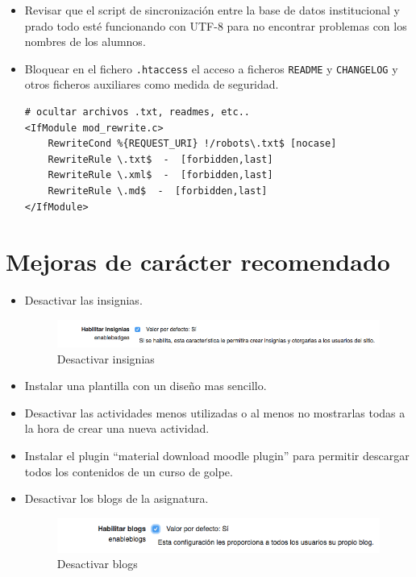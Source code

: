 \begin{itemize}
	\item Revisar que el script de sincronización entre la base de datos institucional y prado todo esté funcionando con UTF-8 para no encontrar problemas con los nombres de los alumnos.


	\item Bloquear en el fichero \texttt{.htaccess} el acceso a ficheros \texttt{README} y \texttt{CHANGELOG} y otros ficheros auxiliares como medida de seguridad.
\begin{lstlisting}
# ocultar archivos .txt, readmes, etc..
<IfModule mod_rewrite.c>
    RewriteCond %{REQUEST_URI} !/robots\.txt$ [nocase]
    RewriteRule \.txt$  -  [forbidden,last]
    RewriteRule \.xml$  -  [forbidden,last]
    RewriteRule \.md$  -  [forbidden,last]
</IfModule>
\end{lstlisting}


\end{itemize}


\section{Mejoras de carácter recomendado}

\begin{itemize}
	\item Desactivar las insignias.
\begin{figure}[H]
\centering
\includegraphics[width=1.0\textwidth]{../screenshots/desactivar_insignias}
\caption{Desactivar insignias}
\end{figure}
	\item Instalar una plantilla con un diseño mas sencillo.
	\item Desactivar las actividades menos utilizadas o al menos no mostrarlas todas a la hora de crear una nueva actividad.
	\item Instalar el plugin ``material download moodle plugin''\cite{moodleplugin} para permitir descargar todos los contenidos de un curso de golpe.
	\item Desactivar los blogs de la asignatura.
\begin{figure}[H]
\centering
\includegraphics[width=1.0\textwidth]{../screenshots/desactivar_blogs}
\caption{Desactivar blogs}
\end{figure}
\end{itemize}

